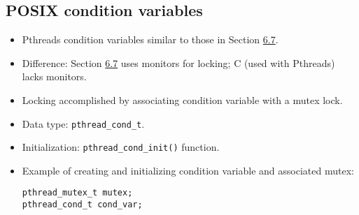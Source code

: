\subsection{POSIX condition variables}
\begin{itemize}
    \item Pthreads condition variables similar to those in Section \hyperref[sec:6.7]{6.7}.
    \item Difference: Section \hyperref[sec:6.7]{6.7} uses monitors for locking; C (used with Pthreads) lacks monitors.
    \item Locking accomplished by associating condition variable with a mutex lock.
    \item Data type: \texttt{pthread\_cond\_t}.
    \item Initialization: \texttt{pthread\_cond\_init()} function.
    \item Example of creating and initializing condition variable and associated mutex:
    \begin{verbatim}
pthread_mutex_t mutex;
pthread_cond_t cond_var;
 

\end{verbatim}
\end{itemize}
